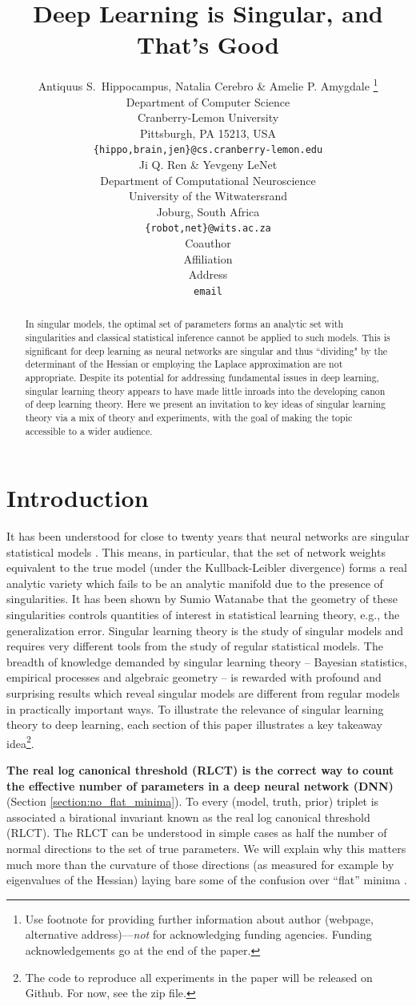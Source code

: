 \documentclass{article} %
\title{Deep Learning is Singular, and That's Good}
\author{Antiquus S.~Hippocampus, Natalia Cerebro \& Amelie P. Amygdale \thanks{ Use footnote for providing further information
about author (webpage, alternative address)---\emph{not} for acknowledging
funding agencies.  Funding acknowledgements go at the end of the paper.} \\
Department of Computer Science\\
Cranberry-Lemon University\\
Pittsburgh, PA 15213, USA \\
\texttt{\{hippo,brain,jen\}@cs.cranberry-lemon.edu} \\
\And
Ji Q. Ren \& Yevgeny LeNet \\
Department of Computational Neuroscience \\
University of the Witwatersrand \\
Joburg, South Africa \\
\texttt{\{robot,net\}@wits.ac.za} \\
\AND
Coauthor \\
Affiliation \\
Address \\
\texttt{email}
}
\begin{document}
\maketitle

\begin{abstract}
In singular models, the optimal set of parameters forms an analytic set with singularities and classical statistical inference cannot be applied to such models. This is significant for deep learning as neural networks are singular and thus ``dividing" by the determinant of the Hessian or employing the Laplace approximation are not appropriate. Despite its potential for addressing fundamental issues in deep learning, singular learning theory appears to have made little inroads into the developing canon of deep learning theory. Here we present an invitation to key ideas of singular learning theory via a mix of theory and experiments, with the goal of making the topic accessible to a wider audience. 
\end{abstract}

\section{Introduction}

It has been understood for close to twenty years that neural networks are singular statistical models \cite{amari_learning_2003, watanabe_almost_2007}. This means, in particular, that the set of network weights equivalent to the true model (under the Kullback-Leibler divergence) forms a real analytic variety which fails to be an analytic manifold due to the presence of singularities. It has been shown by Sumio Watanabe that the geometry of these singularities controls quantities of interest in statistical learning theory, e.g., the generalization error. Singular learning theory \citep{watanabe_algebraic_2009} is the study of singular models and requires very different tools from the study of regular statistical models. The breadth of knowledge demanded by singular learning theory -- Bayesian statistics, empirical processes and algebraic geometry -- is rewarded with profound and surprising results which reveal singular models are different from regular models in practically important ways.
To illustrate the relevance of singular learning theory to deep learning, each section of this paper illustrates a key takeaway idea\footnote{The code to reproduce all experiments in the paper will be released on Github. For now, see the zip file.}. 

\textbf{The real log canonical threshold (RLCT) is the correct way to count the effective number of parameters in a deep neural network (DNN)} (Section \ref{section:no_flat_minima}). 
    To every (model, truth, prior) triplet is associated a birational invariant known as the real log canonical threshold (RLCT). The RLCT can be understood in simple cases as half the number of normal directions to the set of true parameters. We will explain why this matters much more than the curvature of those directions (as measured for example by eigenvalues of the Hessian) laying bare some of the confusion over ``flat'' minima \citep{chaudhari2019entropy, smith2017bayesian, jastrzkebski2017three, zhang_energyentropy_2018}.
\end{document}
